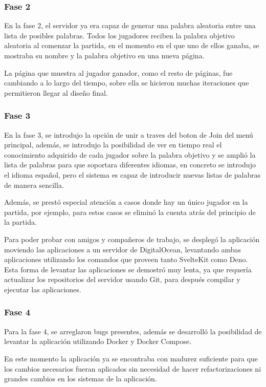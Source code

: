 \subsubsection{Fase 2}
En la fase 2, el servidor ya era capaz de generar una palabra aleatoria entre una lista de posibles palabras. Todos los jugadores reciben la palabra objetivo aleatoria al comenzar la partida, en el momento en el que uno de ellos ganaba, se mostraba su nombre y la palabra objetivo en una nueva página.
	      	      	      	      	      	      	      	      
La página que muestra al jugador ganador, como el resto de páginas, fue cambiando a lo largo del tiempo, sobre ella se hicieron muchas iteraciones que permitieron llegar al diseño final.

\subsubsection{Fase 3}
En la fase 3, se introdujo la opción de unir a traves del boton de Join del menú principal, además, se introdujo la posibilidad de ver en tiempo real el conocimiento adquirido de cada jugador sobre la palabra objetivo y se amplió la lista de palabras para que soportara diferentes idiomas, en concreto se introdujo el idioma español, pero el sistema es capaz de introducir nuevas listas de palabras de manera sencilla.
	      	      	      	      
Además, se prestó especial atención a casos donde hay un único jugador en la partida, por ejemplo, para estos casos se eliminó la cuenta atrás del principio de la partida.
	      	      	      	      	
Para poder probar con amigos y compañeros de trabajo, se desplegó la aplicación moviendo las aplicaciones a un servidor de DigitalOcean, levantando ambas aplicaciones utilizando los comandos que proveen tanto SvelteKit como Deno. Esta forma de levantar las aplicaciones se demostró muy lenta, ya que requería actualizar los repositorios del servidor usando Git, para después compilar y ejecutar las aplicaciones.

\subsubsection{Fase 4} Para la fase 4, se arreglaron bugs presentes, además se desarrolló la posibilidad de levantar la aplicación utilizando Docker y Docker Compose.

En este momento la aplicación ya se encontraba con madurez suficiente para que los cambios necesarios fueran aplicados sin necesidad de hacer refactorizaciones ni grandes cambios en los sistemas de la aplicación.    	      	      	      	      	


